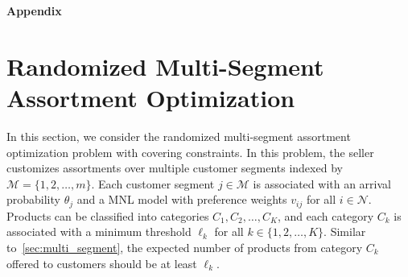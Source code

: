 \documentclass[msom,non-blindrev]{informs3} %
\theoremstyle{definition}
\begin{document}
\begin{appendices}{\Large \noindent\textbf{Appendix}}
{}


\section{Randomized Multi-Segment Assortment Optimization}\label{sec:multi_segment_randomized}

In this section, we consider the randomized multi-segment assortment optimization problem with covering constraints. In this problem, the seller customizes assortments over multiple customer segments indexed by $\mathcal{M}=\{1,2,\dots,m\}$. Each customer segment $j\in\mathcal{M}$ is associated with an arrival probability $\theta_j$ and a MNL model with preference weights $v_{ij}$ for all $i\in\mathcal{N}$. Products can be classified into categories $C_1,C_2,\dots,C_K$, and each category $C_k$ is associated with a minimum threshold $\ell_k$ for all $k\in\{1,2,\dots,K\}$. Similar to~\cref{sec:multi_segment}, the expected number of products from category $C_k$ {  offered} to customers should be at least $\ell_k$.


\end{appendices}
\end{document}

